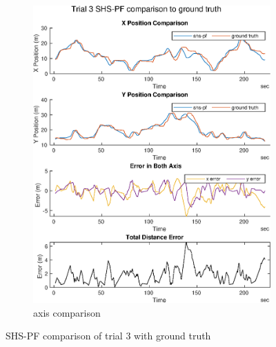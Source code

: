 \begin{figure}[H]
\begin{subfigure}[t]{.45\textwidth}
		\includegraphics[width=\linewidth]{images/20201029_1804_shs-pf_trial_3_1}
		\caption{axis comparison}
		\label{fig:shspf_trial3_comparison}
	\end{subfigure}
	\caption{SHS-PF comparison of trial 3 with ground truth}
	\label{fig:shspf_trial3_shs_gt_comparison}
\end{figure}

